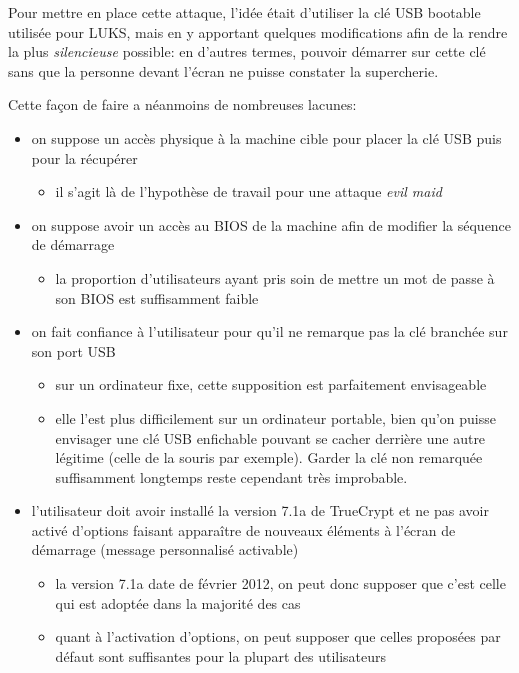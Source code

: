 \documentclass[12pt,a4paper]{article}
\begin{document}
Pour mettre en place cette attaque, l'idée était d'utiliser la clé USB bootable utilisée pour LUKS, mais en y apportant quelques modifications afin de la rendre la plus \textit{silencieuse} possible: en d'autres termes, pouvoir démarrer sur cette clé sans que la personne devant l'écran ne puisse constater la supercherie.

Cette façon de faire a néanmoins de nombreuses lacunes:
{
\renewcommand{\labelitemii}{$\Rightarrow$}
\begin{itemize}
	\item on suppose un accès physique à la machine cible pour placer la clé USB puis pour la récupérer
	\begin{itemize}
		\item il s'agit là de l'hypothèse de travail pour une attaque \textit{evil maid}
	\end{itemize}
	\item on suppose avoir un accès au BIOS de la machine afin de modifier la séquence de démarrage
	\begin{itemize}
		\item la proportion d'utilisateurs ayant pris soin de mettre un mot de passe à son BIOS est suffisamment faible
	\end{itemize}
	\item on fait confiance à l'utilisateur pour qu'il ne remarque pas la clé branchée sur son port USB
	\begin{itemize}
		\item sur un ordinateur fixe, cette supposition est parfaitement envisageable
		\item elle l'est plus difficilement sur un ordinateur portable, bien qu'on puisse envisager une clé USB enfichable pouvant se cacher derrière une autre légitime (celle de la souris par exemple). Garder la clé non remarquée suffisamment longtemps reste cependant très improbable.
	\end{itemize}
	\item l'utilisateur doit avoir installé la version 7.1a de TrueCrypt et ne pas avoir activé d'options faisant apparaître de nouveaux éléments à l'écran de démarrage (message personnalisé activable)
	\begin{itemize}
		\item la version 7.1a date de février 2012, on peut donc supposer que c'est celle qui est adoptée dans la majorité des cas
		\item quant à l'activation d'options, on peut supposer que celles proposées par défaut sont suffisantes pour la plupart des utilisateurs

\end{itemize}
\end{itemize}}
\end{document}
